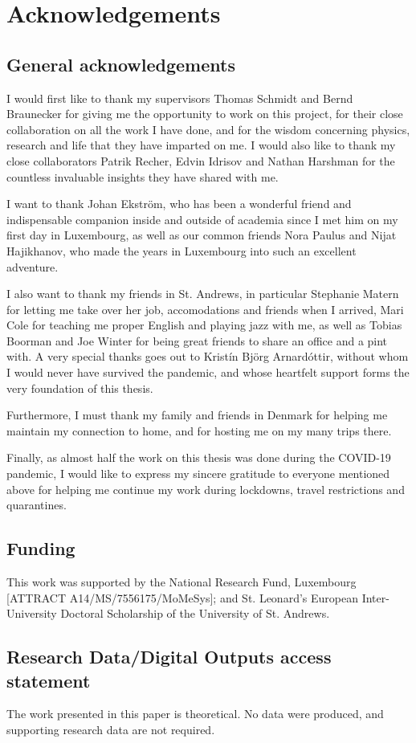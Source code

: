 \chapter{Acknowledgements}


\section{General acknowledgements}

I would first like to thank my supervisors Thomas Schmidt and Bernd Braunecker for giving me the opportunity to work on this project, for their close collaboration on all the work I have done, and for the wisdom concerning physics, research and life that they have imparted on me. I would also like to thank my close collaborators Patrik Recher, Edvin Idrisov and Nathan Harshman for the countless invaluable insights they have shared with me.

I want to thank Johan Ekström, who has been a wonderful friend and indispensable companion inside and outside of academia since I met him on my first day in Luxembourg, as well as our common friends Nora Paulus and Nijat Hajikhanov, who made the years in Luxembourg into such an excellent adventure. 

I also want to thank my friends in St. Andrews, in particular Stephanie Matern for letting me take over her job, accomodations and friends when I arrived, Mari Cole for teaching me proper English and playing jazz with me, as well as Tobias Boorman and Joe Winter for being great friends to share an office and a pint with. A very special thanks goes out to Kristín Björg Arnardóttir, without whom I would never have survived the pandemic, and whose heartfelt support forms the very foundation of this thesis.

Furthermore, I must thank my family and friends in Denmark for helping me maintain my connection to home, and for hosting me on my many trips there.

Finally, as almost half the work on this thesis was done during the COVID-19 pandemic, I would like to express my sincere gratitude to everyone mentioned above for helping me continue my work during lockdowns, travel restrictions and quarantines.

\section{Funding}

This work was supported by the National Research Fund, Luxembourg [ATTRACT A14/MS/7556175/MoMeSys]; and St. Leonard’s European Inter-University Doctoral Scholarship of the University of St. Andrews.

\section{Research Data/Digital Outputs access statement}

The work presented in this paper is theoretical. No data were produced, and supporting research data are not required.

